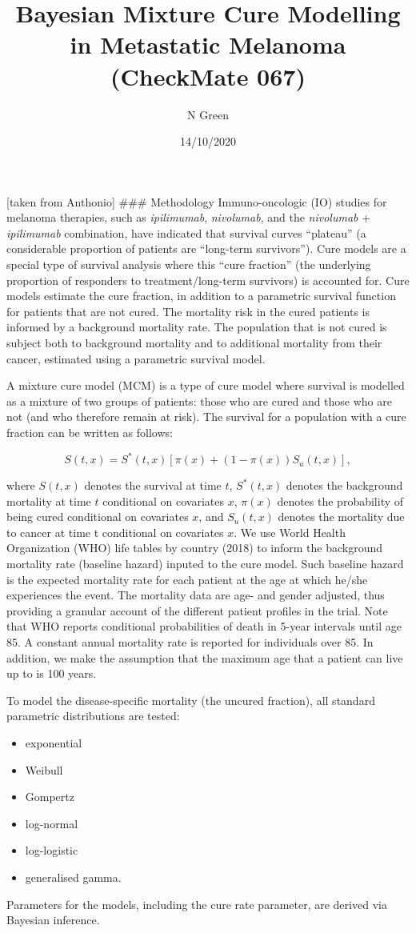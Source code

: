 \documentclass[
]{article}
\title{Bayesian Mixture Cure Modelling in Metastatic Melanoma (CheckMate
067)}
\author{N Green}
\date{14/10/2020}
\providecommand{\tightlist}{%
  \setlength{\itemsep}{0pt}\setlength{\parskip}{0pt}}
\begin{document}
\maketitle

{[}taken from Anthonio{]} \#\#\# Methodology Immuno-oncologic (IO)
studies for melanoma therapies, such as \emph{ipilimumab},
\emph{nivolumab}, and the \emph{nivolumab} + \emph{ipilimumab}
combination, have indicated that survival curves ``plateau'' (a
considerable proportion of patients are ``long-term survivors''). Cure
models are a special type of survival analysis where this ``cure
fraction'' (the underlying proportion of responders to
treatment/long-term survivors) is accounted for. Cure models estimate
the cure fraction, in addition to a parametric survival function for
patients that are not cured. The mortality risk in the cured patients is
informed by a background mortality rate. The population that is not
cured is subject both to background mortality and to additional
mortality from their cancer, estimated using a parametric survival
model.

A mixture cure model (MCM) is a type of cure model where survival is
modelled as a mixture of two groups of patients: those who are cured and
those who are not (and who therefore remain at risk). The survival for a
population with a cure fraction can be written as follows:

\[
S(t, x) = S^*(t, x)[\pi(x) + (1 − \pi(x))S_u(t, x)],
\]

where \(S(t, x)\) denotes the survival at time \(t\), \(S^*(t, x)\)
denotes the background mortality at time \(t\) conditional on covariates
\(x\), \(\pi(x)\) denotes the probability of being cured conditional on
covariates \(x\), and \(S_u(t, x)\) denotes the mortality due to cancer
at time t conditional on covariates \(x\). We use World Health
Organization (WHO) life tables by country (2018) to inform the
background mortality rate (baseline hazard) inputed to the cure model.
Such baseline hazard is the expected mortality rate for each patient at
the age at which he/she experiences the event. The mortality data are
age- and gender adjusted, thus providing a granular account of the
different patient profiles in the trial. Note that WHO reports
conditional probabilities of death in 5-year intervals until age 85. A
constant annual mortality rate is reported for individuals over 85. In
addition, we make the assumption that the maximum age that a patient can
live up to is 100 years.

To model the disease-specific mortality (the uncured fraction), all
standard parametric distributions are tested:

\begin{itemize}
\tightlist
\item
  exponential
\item
  Weibull
\item
  Gompertz
\item
  log-normal
\item
  log-logistic
\item
  generalised gamma.
\end{itemize}

Parameters for the models, including the cure rate parameter, are
derived via Bayesian inference.
\end{document}
